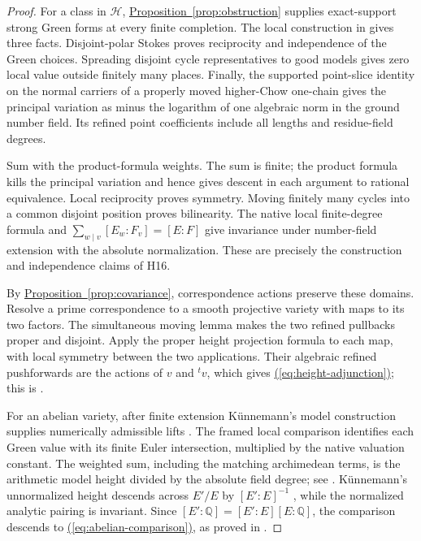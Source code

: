 \documentclass[11pt,a4paper]{article}
\theoremstyle{definition}
\theoremstyle{remark}\newtheorem{remark}[theorem]{Remark}
\numberwithin{equation}{section}
\newcommand{\Q}{\mathbb Q}\newcommand{\R}{\mathbb R}\newcommand{\C}{\mathbb C}
\newcommand{\propref}[1]{\hyperref[#1]{\textcolor{resultlink}{Proposition~\ref*{#1}}}}
\renewcommand{\eqref}[1]{\hyperref[#1]{\textcolor{equationlink}{(\ref*{#1})}}}
\begin{document}
\begin{proof}
For a class in $\mathcal H$, \propref{prop:obstruction} supplies
exact-support strong Green forms at every finite completion.
The local construction in \cite[\texttt{r16h:curved-slice},
\texttt{r16h:global-height}]{InternalHeight} gives three facts.
Disjoint-polar Stokes proves reciprocity and independence of the
Green choices. Spreading disjoint cycle representatives to good
models gives zero local value outside finitely many places. Finally,
the supported point-slice identity on the normal carriers of a
properly moved higher-Chow one-chain gives the principal variation
as minus the logarithm of one algebraic norm in the ground number
field. Its refined point coefficients include all lengths and
residue-field degrees.

Sum with the product-formula weights. The sum is finite; the product
formula kills the principal variation and hence gives descent in
each argument to rational equivalence. Local reciprocity proves
symmetry. Moving finitely many cycles into a common disjoint position
proves bilinearity. The native local finite-degree formula and
$\sum_{w\mid v}[E_w:F_v]=[E:F]$ give invariance under number-field
extension with the absolute normalization. These are precisely the
construction and independence claims of H16.

By \propref{prop:covariance}, correspondence actions preserve these
domains. Resolve a prime correspondence to a smooth projective
variety with maps to its two factors. The simultaneous moving lemma
\cite[\texttt{r16ha:moving}]{InternalHeight} makes the two refined
pullbacks proper and disjoint. Apply the proper height projection
formula to each map, with local symmetry between the two
applications. Their algebraic refined pushforwards are the actions
of $v$ and ${}^tv$, which gives \eqref{eq:height-adjunction}; this
is \cite[\texttt{r16ha:adjunction}]{InternalHeight}.

For an abelian variety, after finite extension K\"unnemann's
model construction supplies numerically admissible lifts
\cite[Theorem 1.6]{Kun}.
The framed local comparison identifies each Green value with its
finite Euler intersection, multiplied by the native valuation
constant. The weighted sum, including the matching archimedean
terms, is the arithmetic model height divided by the absolute field
degree; see \cite[\texttt{r16mm:local}, \texttt{r16mm:global}]{InternalHeight}.
K\"unnemann's unnormalized height descends across $E'/E$ by
$[E':E]^{-1}$ \cite[\S1.4, equation (7), and Lemma 1.5]{Kun},
while the normalized analytic pairing is invariant.
Since $[E':\Q]=[E':E][E:\Q]$, the comparison descends to
\eqref{eq:abelian-comparison}, as proved in
\cite[\texttt{r16mm:abelian}]{InternalHeight}.
\end{proof}
\end{document}
